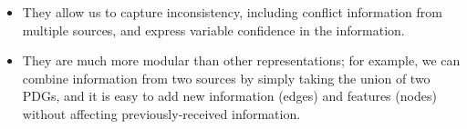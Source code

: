 \documentclass[letterpaper]{article} %
\theoremstyle{plain}
\theoremstyle{definition}
\theoremstyle{remark}
\newcommand{\commentout}[1]{\ignorespaces}
\begin{document}
\begin{itemize}
  \item They allow us to capture inconsistency,
including conflict information from multiple sources, and
express variable confidence in the information. 
\item 
They are much more
modular 
than other representations; 
for example, we can
combine information from two sources by simply taking the union of two
PDGs, and it is easy to add new information 
(edges)
and features (nodes)
without affecting previously-received information.
\commentout{
In contrast to factor graphs,
restrictions of PDGs continue to 
}
\end{itemize}
\end{document}
